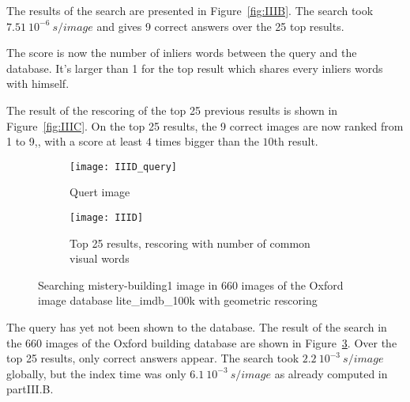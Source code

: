 \documentclass{article}
\begin{document}
The results of the search are presented in Figure~\ref{fig:IIIB}. The search took \( 7.51~10^{-6}~s/image\) and gives 9 correct answers over the 25 top results.


The score is now the number of inliers words between the query and the database. It's larger than 1 for the top result which shares every inliers words with himself.

The result of the rescoring of the top 25 previous results is shown in Figure~\ref{fig:IIIC}. On the top 25 results, the 9 correct images are now ranked from 1 to 9,, with a score at least \( 4\) times bigger than the \(10\)th result.




\begin{figure}
	\begin{subfigure}[b]{0.9\textwidth}
		\centering
		\texttt{[image: IIID\_query]}
		\caption{Quert image}
		\label{fig:III_D1}
	\end{subfigure}

	\begin{subfigure}[b]{0.9\textwidth}
		\centering
		\texttt{[image: IIID]}
		\caption{Top 25 results, rescoring with number of common visual words}
		\label{fig:III_D2}
	\end{subfigure}

	\caption{Searching mistery-building1 image in 660 images of the Oxford image database lite\_imdb\_100k with geometric rescoring}
	\label{fig:IIID}
\end{figure}


The query has yet not been shown to the database. The result of the search in the 660 images of the Oxford building database are shown in Figure~\ref{fig:IIID}. Over the top 25 results, only correct answers appear. The search took \(2.2~10^{-3}~s/image\) globally, but the index time was only \(6.1~10^{-3}~s/image\) as already computed in partIII.B.




\end{document}
